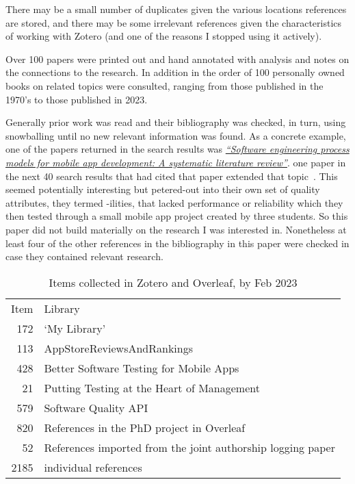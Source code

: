 There may be a small number of duplicates given the various locations references are stored, and there may be some irrelevant references given the characteristics of working with Zotero (and one of the reasons I stopped using it actively).

Over 100 papers were printed out and hand annotated with analysis and notes on the connections to the research. In addition in the order of 100 personally owned books on related topics were consulted, ranging from those published in the 1970's to those published in 2023.

Generally prior work was read and their bibliography was checked, in turn, using snowballing until no new relevant information was found. As a concrete example, one of the papers returned in the search results was \href{https://scholar.google.com/scholar?cites=17913946012612049501&as_sdt=2005&sciodt=0,5&hl=en}{\emph{``Software engineering process models for mobile app development: A systematic literature review''}}. one paper in the next 40 search results that had cited that paper extended that topic~. This seemed potentially interesting but petered-out into their own set of quality attributes, they termed -ilities, that lacked performance or reliability which they then tested through a small mobile app project created by three students. So this paper did not build materially on the research I was interested in. Nonetheless at least four of the other references in the bibliography in this paper were checked in case they contained relevant research. 

\begin{table}
    \centering
    \begin{tabular}{r|l}
       Item  &  Library \\
     172 & `My Library' \\
     113 & AppStoreReviewsAndRankings \\
     428 & Better Software Testing for Mobile Apps \\
      21 & Putting Testing at the Heart of Management \\
     579 & Software Quality API \\
     820 & References in the PhD project in Overleaf \\
      52 & References imported from the joint authorship logging paper \\
      \hline
      2185 & individual references \\
    \end{tabular}
    \caption{Items collected in Zotero and Overleaf, by  Feb 2023}
    \label{tab:zotero-libraries-counts}
\end{table}


